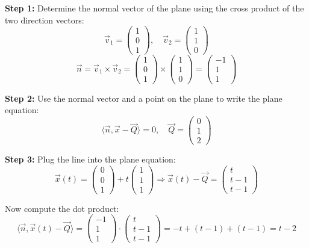 \textbf{Step 1:} Determine the normal vector of the plane using the cross product of the two direction vectors:
\[
	\vec{v}_1 = \begin{pmatrix} 1 \\ 0 \\ 1 \end{pmatrix}, \quad \vec{v}_2 = \begin{pmatrix} 1 \\ 1 \\ 0 \end{pmatrix}
\]
\[
	\vec{n} = \vec{v}_1 \times \vec{v}_2 =
	\begin{pmatrix} 1 \\ 0 \\ 1 \end{pmatrix} \times \begin{pmatrix} 1 \\ 1 \\ 0 \end{pmatrix} =
	\begin{pmatrix} -1 \\ 1 \\ 1 \end{pmatrix}
\]

\textbf{Step 2:} Use the normal vector and a point on the plane to write the plane equation:
\[
	\langle \vec{n}, \vec{x} - \vec{Q} \rangle = 0, \quad \vec{Q} = \begin{pmatrix} 0 \\ 1 \\ 2 \end{pmatrix}
\]

\textbf{Step 3:} Plug the line into the plane equation:
\[
	\vec{x}(t) = \begin{pmatrix} 0 \\ 0 \\ 1 \end{pmatrix} + t \begin{pmatrix} 1 \\ 1 \\ 1 \end{pmatrix}
	\Rightarrow
	\vec{x}(t) - \vec{Q} =
	\begin{pmatrix} t \\ t - 1 \\ t - 1 \end{pmatrix}
\]

Now compute the dot product:
\[
	\langle \vec{n}, \vec{x}(t) - \vec{Q} \rangle =
	\begin{pmatrix} -1 \\ 1 \\ 1 \end{pmatrix} \cdot \begin{pmatrix} t \\ t - 1 \\ t - 1 \end{pmatrix}
	= -t + (t - 1) + (t - 1) = t - 2
\]

